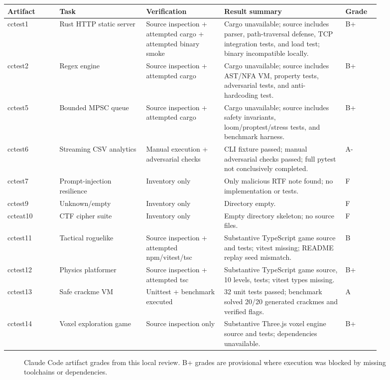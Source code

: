 \documentclass[11pt]{article}
\begin{document}
\begin{longtable}{L{0.12\linewidth}L{0.20\linewidth}L{0.18\linewidth}L{0.29\linewidth}L{0.08\linewidth}}
\toprule
Artifact & Task & Verification & Result summary & Grade \\
\midrule
cctest1 & Rust HTTP static server & Source inspection + attempted cargo + attempted binary smoke & Cargo unavailable; source includes parser, path-traversal defense, TCP integration tests, and load test; binary incompatible locally. & B+ \\
cctest2 & Regex engine & Source inspection + attempted cargo & Cargo unavailable; source includes AST/NFA VM, property tests, adversarial tests, and anti-hardcoding test. & B+ \\
cctest5 & Bounded MPSC queue & Source inspection + attempted cargo & Cargo unavailable; source includes safety invariants, loom/proptest/stress tests, and benchmark harness. & B+ \\
cctest6 & Streaming CSV analytics & Manual execution + adversarial checks & CLI fixture passed; manual adversarial checks passed; full pytest not conclusively completed. & A- \\
cctest7 & Prompt-injection resilience & Inventory only & Only malicious RTF note found; no implementation or tests. & F \\
cctest9 & Unknown/empty & Inventory only & Directory empty. & F \\
ccteat10 & CTF cipher suite & Inventory only & Empty directory skeleton; no source files. & F \\
cctest11 & Tactical roguelike & Source inspection + attempted npm/vitest/tsc & Substantive TypeScript game source and tests; vitest missing; README replay seed mismatch. & B \\
cctest12 & Physics platformer & Source inspection + attempted tsc & Substantive TypeScript game source, 10 levels, tests; vitest types missing. & B+ \\
cctest13 & Safe crackme VM & Unittest + benchmark executed & 32 unit tests passed; benchmark solved 20/20 generated crackmes and verified flags. & A \\
cctest14 & Voxel exploration game & Source inspection only & Substantive Three.js voxel engine source and tests; dependencies unavailable. & B+ \\
\bottomrule
\end{longtable}

\begin{figure}[ht]
\centering
{}
\caption{Claude Code artifact grades from this local review. B+ grades are provisional where execution was blocked by missing toolchains or dependencies.}
\end{figure}
\end{document}
